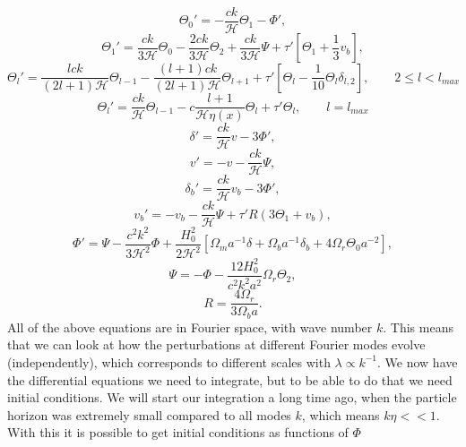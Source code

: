 \documentclass[a4paper,norsk, 10pt]{article}
\begin{document}
\begin{equation}
\Theta_0 ' = -\frac{ck}{\mathcal{H}}\Theta_1 - \Phi',
\end{equation}
\begin{equation}
\Theta_1' = \frac{ck}{3\mathcal{H}}\Theta_0 - \frac{2ck}{3\mathcal{H}}\Theta_2 + \frac{ck}{3\mathcal{H}}\Psi + \tau'\left[\Theta_1 + \frac{1}{3}v_b\right],
\end{equation}
\begin{equation}
\Theta_l' = \frac{lck}{(2l+1)\mathcal{H}}\Theta_{l-1} - \frac{(l+1)ck}{(2l+1)\mathcal{H}}\Theta_{l+1} + \tau'\left[\Theta_l - \frac{1}{10}\Theta_l \delta_{l,2}\right],\qquad 2 \leq l < l_{max}
\end{equation}
\begin{equation}
\Theta_l' = \frac{ck}{\mathcal{H}}\Theta_{l-1} - c\frac{l+1}{\mathcal{H}\eta(x)}\Theta_l + \tau'\Theta_l, \qquad l = l_{max}
\end{equation}
\begin{equation}
\delta' = \frac{ck}{\mathcal{H}}v - 3\Phi',
\end{equation}
\begin{equation}
v' = -v - \frac{ck}{\mathcal{H}}\Psi,
\end{equation}
\begin{equation}
\delta_b' = \frac{ck}{\mathcal{H}}v_b -3\Phi',
\end{equation}
\begin{equation}
v_b' = -v_b - \frac{ck}{\mathcal{H}}\Psi + \tau' R(3\Theta_1 + v_b),
\end{equation}
\begin{equation}
\Phi' = \Psi - \frac{c^2k^2}{3\mathcal{H}^2}\Phi + \frac{H_0^2}{2\mathcal{H}^2}\left[\Omega_ma^{-1}\delta + \Omega_b a^{-1}\delta_b + 4\Omega_r\Theta_0 a^{-2}\right],
\end{equation}
\begin{equation}
\Psi = -\Phi - \frac{12H_0^2}{c^2k^2a^2}\Omega_r\Theta_2,
\end{equation}
\begin{equation}
R = \frac{4\Omega_r}{3\Omega_b a}.
\end{equation}
All of the above equations are in Fourier space, with wave number $k$. This means that we can look at how the perturbations at different Fourier modes evolve (independently), which corresponds to different scales with $\lambda \propto k^{-1}$. We now have the differential equations we need to integrate, but to be able to do that we need initial conditions. We will start our integration a long time ago, when the particle horizon was extremely small compared to all modes $k$, which means $k\eta << 1$. With this it is possible to get initial conditions as functions of $\Phi$
\end{document}
